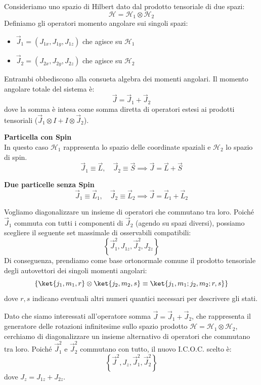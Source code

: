 Consideriamo uno spazio di Hilbert dato dal prodotto tensoriale di due spazi:
\[
    \mathcal{H} = \mathcal{H}_1 \otimes \mathcal{H}_2
\]
Definiamo gli operatori momento angolare sui singoli spazi:
\begin{itemize}
    \item \( \vec{J}_1 = (J_{1x}, J_{1y}, J_{1z}) \) che agisce su \( \mathcal{H}_1 \)
    \item \( \vec{J}_2 = (J_{2x}, J_{2y}, J_{2z}) \) che agisce su \( \mathcal{H}_2 \)
\end{itemize}
Entrambi obbediscono alla consueta algebra dei momenti angolari. Il momento angolare totale del sistema è:
\begin{equation}
    \vec{J} = \vec{J}_1 + \vec{J}_2
\end{equation}
dove la somma è intesa come somma diretta di operatori estesi ai prodotti tensoriali (\( \vec{J}_1 \otimes I + I \otimes \vec{J}_2 \)).

\begin{example}
    \textbf{Particella con Spin} \\
    In questo caso \( \mathcal{H}_1 \) rappresenta lo spazio delle coordinate spaziali e \( \mathcal{H}_2 \) lo spazio di spin.
    \[
        \vec{J}_1 \equiv \vec{L}, \quad \vec{J}_2 \equiv \vec{S} \implies \vec{J} = \vec{L} + \vec{S}
    \]
\end{example}

\begin{example}
    \textbf{Due particelle senza Spin}
    \[
        \vec{J}_1 \equiv \vec{L}_1, \quad \vec{J}_2 \equiv \vec{L}_2 \implies \vec{J} = \vec{L}_1 + \vec{L}_2
    \]
\end{example}

Vogliamo diagonalizzare un insieme di operatori che commutano tra loro. Poiché \( \vec{J}_1 \) commuta con tutti i componenti di \( \vec{J}_2 \) (agendo su spazi diversi),
possiamo scegliere il seguente set massimale di osservabili compatibili:
\begin{equation}
    \left\{ \vec{J}_1^2, J_{1z}, \vec{J}_2^2, J_{2z} \right\}
\end{equation}
Di conseguenza, prendiamo come base ortonormale comune il prodotto tensoriale degli autovettori dei singoli momenti angolari:
\[
    \left\{ \ket{j_1, m_1, r} \otimes \ket{j_2, m_2, s} \equiv \ket{j_1, m_1; j_2, m_2; r, s} \right\}
\]
dove \( r,s \) indicano eventuali altri numeri quantici necessari per descrivere gli stati.

Dato che siamo interessati all'operatore somma \( \vec{J} = \vec{J}_1 + \vec{J}_2 \), che rappresenta il generatore delle rotazioni infinitesime sullo spazio prodotto \( \mathcal{H} = \mathcal{H}_1 \otimes \mathcal{H}_2 \), 
cerchiamo di diagonalizzare un insieme alternativo di operatori che commutano tra loro. Poiché \( \vec{J}_1^2 \) e \( \vec{J}_2^2 \) commutano con tutto, il nuovo I.C.O.C. scelto è:
\begin{equation}
    \left\{ \vec{J}^2, J_z, \vec{J}_1^2, \vec{J}_2^2 \right\}
\end{equation}
dove \( J_z = J_{1z} + J_{2z} \).

